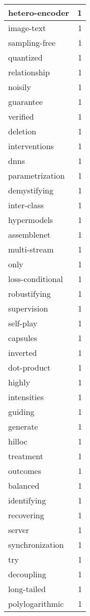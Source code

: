 \begin{table}[h]
\begin{tabular}{|l|r|}
\hline
hetero-encoder & 1 \\
\hline
image-text & 1 \\
\hline
sampling-free & 1 \\
\hline
quantized & 1 \\
\hline
relationship & 1 \\
\hline
noisily & 1 \\
\hline
guarantee & 1 \\
\hline
verified & 1 \\
\hline
deletion & 1 \\
\hline
interventions & 1 \\
\hline
dnns & 1 \\
\hline
parametrization & 1 \\
\hline
demystifying & 1 \\
\hline
inter-class & 1 \\
\hline
hypermodels & 1 \\
\hline
assemblenet & 1 \\
\hline
multi-stream & 1 \\
\hline
only & 1 \\
\hline
loss-conditional & 1 \\
\hline
robustifying & 1 \\
\hline
supervision & 1 \\
\hline
self-play & 1 \\
\hline
capsules & 1 \\
\hline
inverted & 1 \\
\hline
dot-product & 1 \\
\hline
highly & 1 \\
\hline
intensities & 1 \\
\hline
guiding & 1 \\
\hline
generate & 1 \\
\hline
hilloc & 1 \\
\hline
treatment & 1 \\
\hline
outcomes & 1 \\
\hline
balanced & 1 \\
\hline
identifying & 1 \\
\hline
recovering & 1 \\
\hline
server & 1 \\
\hline
synchronization & 1 \\
\hline
try & 1 \\
\hline
decoupling & 1 \\
\hline
long-tailed & 1 \\
\hline
polylogarithmic & 1 \\

\end{tabular}
\end{table}
